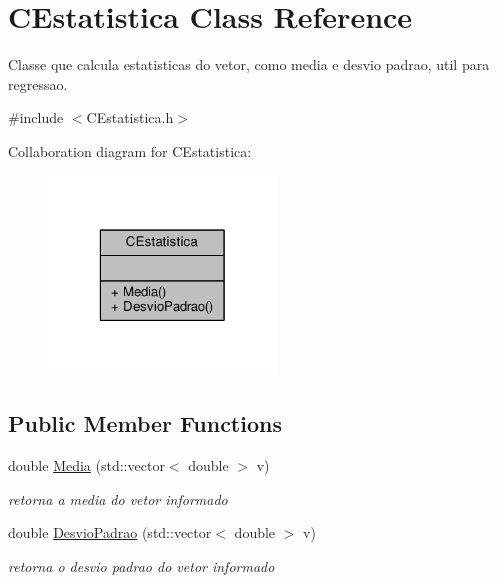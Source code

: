 \hypertarget{classCEstatistica}{\section{C\-Estatistica Class Reference}
\label{classCEstatistica}
}


Classe que calcula estatisticas do vetor, como media e desvio padrao, util para regressao.  




{\ttfamily \#include $<$C\-Estatistica.\-h$>$}



Collaboration diagram for C\-Estatistica\-:
\nopagebreak
\begin{figure}[H]
\begin{center}
\leavevmode
\includegraphics[width=172pt]{classCEstatistica__coll__graph}
\end{center}
\end{figure}
\subsection*{Public Member Functions}
\begin{DoxyCompactItemize}
\item 
\hypertarget{classCEstatistica_a9c0b46a34059ed41c94f1816808badd7}{double \hyperlink{classCEstatistica_a9c0b46a34059ed41c94f1816808badd7}{Media} (std\-::vector$<$ double $>$ v)}\label{classCEstatistica_a9c0b46a34059ed41c94f1816808badd7}

\begin{DoxyCompactList}\small\item\em retorna a media do vetor informado \end{DoxyCompactList}\item 
\hypertarget{classCEstatistica_ae7ad27a27293f6447160ca0f38c37559}{double \hyperlink{classCEstatistica_ae7ad27a27293f6447160ca0f38c37559}{Desvio\-Padrao} (std\-::vector$<$ double $>$ v)}\label{classCEstatistica_ae7ad27a27293f6447160ca0f38c37559}

\begin{DoxyCompactList}\small\item\em retorna o desvio padrao do vetor informado \end{DoxyCompactList}\end{DoxyCompactItemize}


